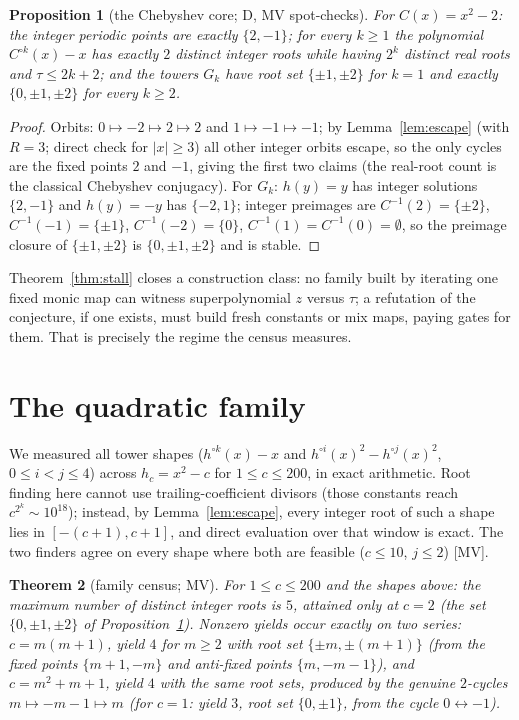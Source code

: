 \documentclass[11pt]{article}
\newtheorem{theorem}{Theorem}[section]
\newtheorem{proposition}[theorem]{Proposition}
\theoremstyle{definition}
\theoremstyle{remark}
\begin{document}
\begin{proposition}[the Chebyshev core; D, MV spot-checks]\label{prop:cheb}
For $C(x) = x^2 - 2$: the integer periodic points are exactly $\{2, -1\}$; for every
$k \ge 1$ the polynomial $C^{\circ k}(x) - x$ has exactly $2$ distinct integer roots
while having $2^k$ distinct real roots and $\tau \le 2k + 2$; and the towers $G_k$
have root set $\{\pm 1, \pm 2\}$ for $k = 1$ and exactly $\{0, \pm 1, \pm 2\}$ for
every $k \ge 2$.
\end{proposition}
\begin{proof}
Orbits: $0 \mapsto -2 \mapsto 2 \mapsto 2$ and $1 \mapsto -1 \mapsto -1$; by
Lemma~\ref{lem:escape} (with $R = 3$; direct check for $|x| \ge 3$) all other integer
orbits escape, so the only cycles are the fixed points $2$ and $-1$, giving the first
two claims (the real-root count is the classical Chebyshev conjugacy). For $G_k$:
$h(y) = y$ has integer solutions $\{2, -1\}$ and $h(y) = -y$ has $\{-2, 1\}$;
integer preimages are $C^{-1}(2) = \{\pm 2\}$, $C^{-1}(-1) = \{\pm 1\}$,
$C^{-1}(-2) = \{0\}$, $C^{-1}(1) = C^{-1}(0) = \emptyset$, so the preimage closure
of $\{\pm 1, \pm 2\}$ is $\{0, \pm 1, \pm 2\}$ and is stable.
\end{proof}

Theorem~\ref{thm:stall} closes a construction class: no family built by iterating one
fixed monic map can witness superpolynomial $z$ versus $\tau$; a refutation of the
conjecture, if one exists, must build fresh constants or mix maps, paying gates for
them. That is precisely the regime the census measures.

\section{The quadratic family}\label{sec:family}

We measured all tower shapes ($h^{\circ k}(x) - x$ and
$h^{\circ i}(x)^2 - h^{\circ j}(x)^2$, $0 \le i < j \le 4$) across
$h_c = x^2 - c$ for $1 \le c \le 200$, in exact arithmetic. Root finding here cannot
use trailing-coefficient divisors (those constants reach $c^{2^k} \sim 10^{18}$);
instead, by Lemma~\ref{lem:escape}, every integer root of such a shape lies in
$[-(c+1), c+1]$, and direct evaluation over that window is exact. The two finders
agree on every shape where both are feasible ($c \le 10$, $j \le 2$) [MV].

\begin{theorem}[family census; MV]\label{thm:family}
For $1 \le c \le 200$ and the shapes above: the maximum number of distinct integer
roots is $5$, attained only at $c = 2$ (the set $\{0, \pm1, \pm2\}$ of
Proposition~\ref{prop:cheb}). Nonzero yields occur exactly on two series:
$c = m(m+1)$, yield $4$ for $m \ge 2$ with root set $\{\pm m, \pm(m+1)\}$ (from the
fixed points $\{m{+}1, -m\}$ and anti-fixed points $\{m, -m{-}1\}$), and
$c = m^2 + m + 1$, yield $4$ with the same root sets, produced by the genuine
$2$-cycles $m \mapsto -m-1 \mapsto m$ (for $c = 1$: yield $3$, root set
$\{0, \pm 1\}$, from the cycle $0 \leftrightarrow -1$).
\end{theorem}
\end{document}
